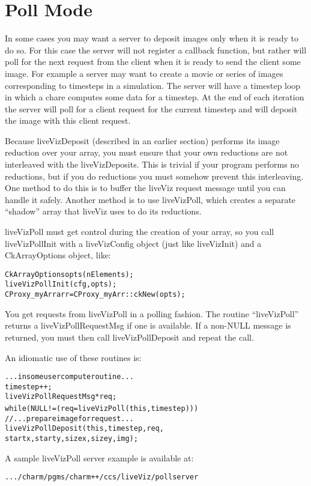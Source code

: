 \section{Poll Mode}

In some cases you may want a server to deposit images only when it is ready to do so. For this case the server will not register a callback function, but rather will poll for the next request from the client when it is ready to send the client some image. For example a server may want to create a movie or series of images corresponding to timesteps in a simulation. The server will  have a timestep loop in which a chare computes some data for a timestep. At the end of each iteration the server will poll for a client request for the current timestep and will deposit the image with this client request.

Because liveVizDeposit (described in an earlier section) performs its image reduction over your array, 
you must ensure that your own reductions are not interleaved with the 
liveVizDeposits.  This is trivial if your program performs no reductions,
but if you do reductions you must somehow prevent this interleaving.
One method to do this is to buffer the liveViz request message until 
you can handle it safely.  Another method is to use liveVizPoll,
which creates a separate ``shadow'' array that liveViz uses to do
its reductions.

liveVizPoll must get control during the creation of your array,
so you call liveVizPollInit with a liveVizConfig object (just like
liveVizInit) and a CkArrayOptions object, like:

\begin{alltt}
        CkArrayOptions opts(nElements);
        liveVizPollInit(cfg,opts);
        CProxy_myArr arr=CProxy_myArr::ckNew(opts);
\end{alltt}

You get requests from liveVizPoll in a polling fashion.
The routine ``liveVizPoll'' returns a liveVizPollRequestMsg
if one is available.  If a non-NULL message is returned, you
must then call liveVizPollDeposit and repeat the call.

An idiomatic use of these routines is:
\begin{alltt}
	... in some user compute routine ...
        timestep++;
        liveVizPollRequestMsg *req;
        while (NULL!=(req=liveVizPoll(this,timestep))) {
                //...prepare image for request...
                liveVizPollDeposit(this,timestep,req,
                        startx,starty,sizex,sizey,img);
        }
\end{alltt}

A sample liveVizPoll server example is available at:
\begin{alltt}
           .../charm/pgms/charm++/ccs/liveViz/pollserver
\end{alltt}

